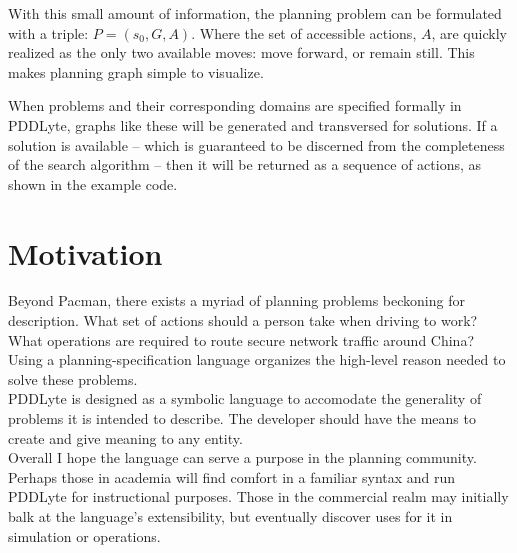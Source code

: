 \documentclass[
a4paper, %
11pt, %
onecolumn, %
openany, %
]{memoir}
\begin{document}
{With this small amount of information, the planning problem can be formulated with a triple: $P = (s_0, G, A)$. Where the set of accessible actions, $A$, are quickly realized as the only two available moves: move forward, or remain still. This makes planning graph simple to visualize.\\

\begin{center}
\end{center}

When problems and their corresponding domains are specified formally in PDDLyte, graphs like these will be generated and transversed for solutions. If a solution is available -- which is guaranteed to be discerned from the completeness of the search algorithm -- then it will be returned as a sequence of actions, as shown in the example code.\\





\section{Motivation}
Beyond Pacman, there exists a myriad of planning problems beckoning for description. What set of actions should a person take when driving to work? What operations are required to route secure network traffic around China? Using a planning-specification language organizes the high-level reason needed to solve these problems.\\

PDDLyte is designed as a symbolic language to accomodate the generality of problems it is intended to describe. The developer should have the means to create and give meaning to any entity.\\

Overall I hope the language can serve a purpose in the planning community. Perhaps those in academia will find comfort in a familiar syntax and run PDDLyte for instructional purposes. Those in the commercial realm may initially balk at the language's extensibility, but eventually discover uses for it in simulation or operations.

}
\end{document}
